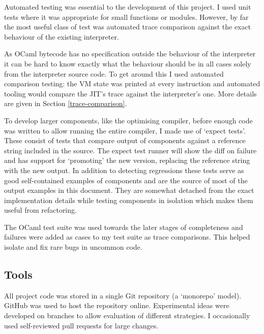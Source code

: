 Automated testing was essential to the development of this project. I used unit tests where it was
appropriate for small functions or modules. However, by far the most useful class of test was
automated trace comparison against the exact behaviour of the existing interpreter.

As OCaml bytecode has no specification outside the behaviour of the interpreter it can be hard
to know exactly what the behaviour should be in all cases solely from the interpreter source code.
To get around this I used automated comparison testing: the VM state was printed at every
instruction and automated
tooling would compare the JIT's trace against the interpreter's one. More details are given in
Section \ref{trace-comparison}.

To develop larger components, like the optimising compiler, before enough code was written to allow
running the entire compiler, I made use of `expect tests'. These consist of tests that compare
output of components against a reference string included in the source. The expect test runner will
show the diff on failure and has support for `promoting' the new version, replacing the reference
string with the new output. In addition to detecting regressions these tests serve as good
self-contained examples of components and are the source of most of the output examples in this
document. They are somewhat detached from the exact implementation details while testing components
in isolation which makes them useful from refactoring.

The OCaml test suite was used towards the later stages of completeness and failures were added as
cases to my test suite as trace comparisons. This helped isolate and fix rare bugs in uncommon
code.


\subsection{Tools}

All project code was stored in a single Git repository (a `monorepo' model). GitHub was used to
host the repository online. Experimental ideas were developed on
branches to allow evaluation of different
strategies. I occasionally used self-reviewed pull requests for large changes.

